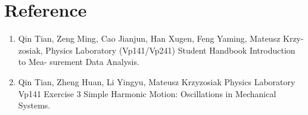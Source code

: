 \section{Reference}

\begin{enumerate}
\item  Qin Tian, Zeng Ming, Cao Jianjun, Han Xugen, Feng Yaming, Mateusz Krzy- zosiak, Physics Laboratory (Vp141/Vp241) Student Handbook Introduction to Mea- surement Data Analysis.
\item  Qin Tian, Zheng Huan, Li Yingyu, Mateusz Krzyzosiak Physics Laboratory Vp141 Exercise 3 Simple Harmonic Motion: Oscillations in Mechanical Systems.
\end{enumerate}	